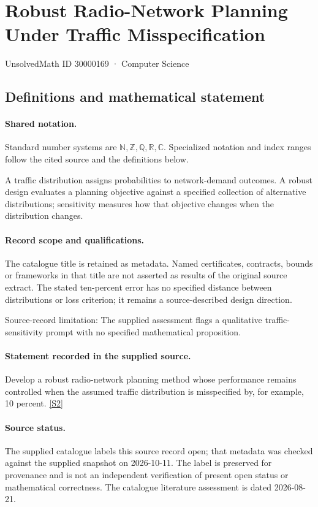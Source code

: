 \documentclass[11pt]{article}
\newcommand{\sref}[2]{\hyperlink{source:#1:#2}{[S#2]}}
\begin{document}
\setcounter{section}{30000168}
\section{Robust Radio-Network Planning Under Traffic Misspecification}\label{30000169}
{\small\sffamily UnsolvedMath ID 30000169 · Computer Science}
\subsection{Definitions and mathematical statement}

\paragraph{Shared notation.}Standard number systems are $\mathbb N,\mathbb Z,\mathbb Q,\mathbb R,\mathbb C$. Specialized notation and index ranges follow the cited source and the definitions below.


A traffic distribution assigns probabilities to network-demand outcomes. A robust design evaluates a planning objective against a specified collection of alternative distributions; sensitivity measures how that objective changes when the distribution changes.
\paragraph{Record scope and qualifications.}
The catalogue title is retained as metadata. Named certificates, contracts, bounds or frameworks in that title are not asserted as results of the original source extract.
The stated ten-percent error has no specified distance between distributions or loss criterion; it remains a source-described design direction.

Source-record limitation: The supplied assessment flags a qualitative traffic-sensitivity prompt with no specified mathematical proposition.
\paragraph{Statement recorded in the supplied source.}
Develop a robust radio-network planning method whose performance remains controlled when the assumed traffic distribution is misspecified by, for example, 10 percent. \sref{30000169}{2}
\paragraph{Source status.}
The supplied catalogue labels this source record open; that metadata was checked against the supplied snapshot on 2026-10-11. The label is preserved for provenance and is not an independent verification of present open status or mathematical correctness. The catalogue literature assessment is dated 2026-08-21.
\end{document}
